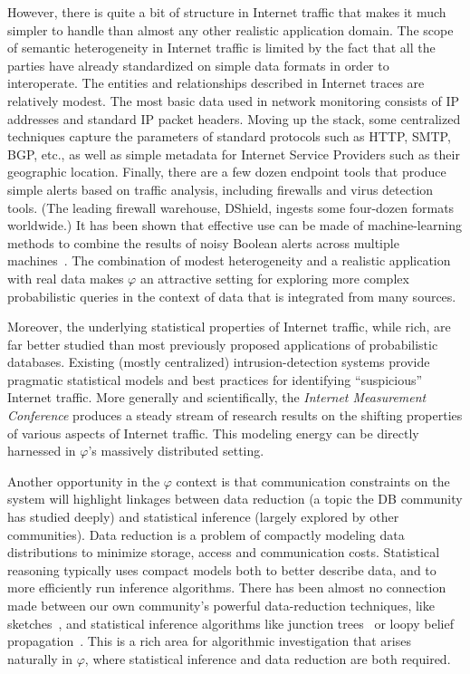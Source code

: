 \documentclass{acm_proc_article-sp}
\def\philogo{{\large $\varphi$}\xspace}
\begin{document}
However, there is quite a bit of structure in Internet traffic that makes it much simpler to handle than almost any other realistic application domain. The scope of semantic heterogeneity in Internet traffic is limited by the fact that all the parties have already standardized on simple data formats in order to interoperate. The entities and relationships described in Internet traces are relatively modest. The most basic data used in network monitoring consists of IP addresses and standard IP packet headers. Moving up the stack, some centralized techniques capture the parameters of standard protocols such as HTTP, SMTP, BGP, etc., as well as simple metadata for Internet Service Providers such as their geographic location. Finally, there are a few dozen endpoint tools that produce simple alerts based on traffic analysis, including firewalls and virus detection tools. (The leading firewall warehouse, DShield, ingests some four-dozen formats worldwide.) It has been shown that effective use can be made of machine-learning methods to combine the results of noisy Boolean alerts across multiple machines~\cite{ddi}. The combination of modest heterogeneity and a realistic application with real data makes \philogo an attractive setting for exploring more complex probabilistic queries in the context of data that is integrated from many sources.

Moreover, the underlying statistical properties of Internet traffic, while rich, are far better studied than most previously proposed applications of probabilistic databases. Existing (mostly centralized) intrusion-detection systems provide pragmatic statistical models and best practices for identifying ``suspicious'' Internet traffic. More generally and scientifically, the {\em Internet Measurement Conference} produces a steady stream of research results on the shifting properties of various aspects of Internet traffic. This modeling energy can be directly harnessed in \philogo's massively distributed setting.

Another opportunity in the \philogo context is that communication constraints on the system will highlight linkages between data reduction (a topic the DB community has studied deeply) and statistical inference (largely explored by other communities). Data reduction is a problem of compactly modeling data distributions to minimize storage, access and communication costs. Statistical reasoning typically uses compact models both to better describe data, and to more efficiently run inference algorithms. There has been almost no connection made between our own community's powerful data-reduction techniques, like sketches~\cite{cormode05,sketches}, and statistical inference algorithms like junction trees~\cite{jt} or loopy belief propagation~\cite{loopy}. This is a rich area for algorithmic investigation that arises naturally in \philogo, where statistical inference and data reduction are both required.
\end{document}
